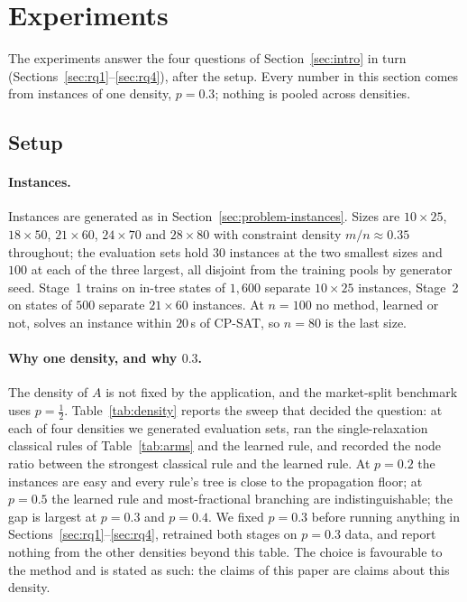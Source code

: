 \documentclass[final,5p,times,twocolumn,authoryear]{elsarticle}
\begin{document}
\section{Experiments}
\label{sec:exp}

The experiments answer the four questions of Section~\ref{sec:intro} in turn (Sections~\ref{sec:rq1}--\ref{sec:rq4}), after the setup. Every number in this section comes from instances of one density, $p=0.3$; nothing is pooled across densities.

\subsection{Setup}
\label{sec:exp-setup}

\paragraph{Instances.} Instances are generated as in Section~\ref{sec:problem-instances}. Sizes are $10\times25$, $18\times50$, $21\times60$, $24\times70$ and $28\times80$ with constraint density $m/n\approx0.35$ throughout; the evaluation sets hold $30$ instances at the two smallest sizes and $100$ at each of the three largest, all disjoint from the training pools by generator seed. Stage~1 trains on in-tree states of $1{,}600$ separate $10\times25$ instances, Stage~2 on states of $500$ separate $21\times60$ instances. At $n=100$ no method, learned or not, solves an instance within $20$\,s of CP-SAT, so $n=80$ is the last size.

\paragraph{Why one density, and why $0.3$.} The density of $A$ is not fixed by the application, and the market-split benchmark uses $p=\frac12$. Table~\ref{tab:density} reports the sweep that decided the question: at each of four densities we generated evaluation sets, ran the single-relaxation classical rules of Table~\ref{tab:arms} and the learned rule, and recorded the node ratio between the strongest classical rule and the learned rule. At $p=0.2$ the instances are easy and every rule's tree is close to the propagation floor; at $p=0.5$ the learned rule and most-fractional branching are indistinguishable; the gap is largest at $p=0.3$ and $p=0.4$. We fixed $p=0.3$ before running anything in Sections~\ref{sec:rq1}--\ref{sec:rq4}, retrained both stages on $p=0.3$ data, and report nothing from the other densities beyond this table. The choice is favourable to the method and is stated as such: the claims of this paper are claims about this density.
\end{document}

